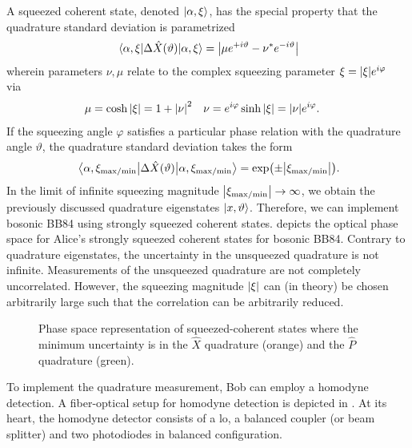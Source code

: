 A squeezed coherent state, denoted $\ket{\alpha,\xi}$, has the special property that the quadrature standard deviation is parametrized~\cite[p.~95]{Vogel2006}
\begin{equation}
	\expval{\Delta\hat{X}(\vartheta)}{\alpha,\xi}
	=
	\abs{\mu e^{+i\vartheta}-\nu^* e^{-i\vartheta}}
	\label{eq:squeezed_quadrature_std}
\end{equation}
wherein parameters $\nu,\mu$ relate to the complex squeezing parameter $\xi=\abs{\xi}e^{i\varphi}$ via~\cite[p.~90]{Vogel2006}
\begin{align}
	\mu
	&=
	\cosh\abs{\xi}
	=
	1+\abs{\nu}^2
	&
	\nu
	&=
	e^{i\varphi}
	\sinh\abs{\xi}
	=
	\abs{\nu}
	e^{i\varphi}
	\label{eq:squeezing_parameters}
	.
\end{align}
If the squeezing angle $\varphi$ satisfies a particular phase relation with the quadrature angle $\vartheta$, the quadrature standard deviation takes the form~\cite[p.~96]{Vogel2006}
\begin{equation}
	\expval{\Delta\hat{X}(\vartheta)}{\alpha,\xi_{\text{max}/\text{min}}}
	=
	\exp(\pm\abs{\xi_{\text{max}/\text{min}}})
	.
\end{equation}
In the limit of infinite squeezing magnitude $\abs{\xi_{\text{max}/\text{min}}}\to\infty$, we obtain the previously discussed quadrature eigenstates $\ket{x,\vartheta}$.
Therefore, we can implement bosonic BB84 using strongly squeezed coherent states.
 depicts the optical phase space for Alice's strongly squeezed coherent states for bosonic BB84.
Contrary to quadrature eigenstates, the uncertainty in the unsqueezed quadrature is not infinite.
Measurements of the unsqueezed quadrature are not completely uncorrelated.
However, the squeezing magnitude $\abs{\xi}$ can (in theory) be chosen arbitrarily large such that the correlation can be arbitrarily reduced.
\begin{figure}[htb]
	\centering
	
	\caption{Phase space representation of squeezed-coherent states where the minimum uncertainty is in the $\hat{X}$ quadrature (orange) and the $\hat{P}$ quadrature (green).}\label{fig:phase_space_squeezed}
\end{figure}
To implement the quadrature measurement, Bob can employ a homodyne detection.
A fiber-optical setup for homodyne detection is depicted in .
At its heart, the homodyne detector consists of a \gls{lo}, a balanced coupler (or beam splitter) and two photodiodes in balanced configuration.
